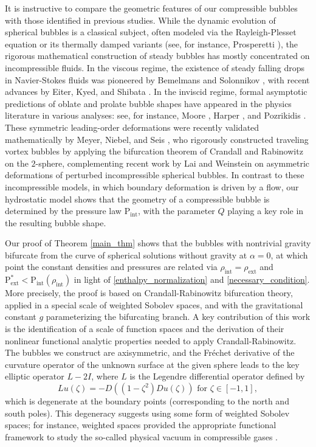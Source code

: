 \documentclass[11pt,reqno]{amsart}
\numberwithin{equation}{section}
\newcommand{\m}{\mathrm}
\def\pint{\m{P}_{\m{int}}}
\def\pext{\m{P}_{\m{ext}}}
\begin{document}
It is instructive to compare the geometric features of our compressible bubbles with those identified in previous studies.  While the dynamic evolution of spherical bubbles is a classical subject, often modeled via the Rayleigh-Plesset equation or its thermally damped variants (see, for instance, Prosperetti \cite{Pro_1991}), the rigorous mathematical construction of steady bubbles has mostly concentrated on incompressible fluids.  In the viscous regime, the existence of steady falling drops in Navier-Stokes fluids was pioneered by Bemelmans \cite{B_1981} and Solonnikov \cite{S_1999}, with recent advances by Eiter, Kyed, and Shibata \cite{EKS_2023}. In the inviscid regime, formal asymptotic predictions of oblate and prolate bubble shapes have appeared in the physics literature in various analyses: see, for instance, Moore \cite{M_1959}, Harper \cite{H_1972}, and Pozrikidis \cite{P_1989}.  These symmetric leading-order deformations were recently validated mathematically by Meyer, Niebel, and Seis \cite{MNS_2025}, who rigorously constructed traveling vortex bubbles by applying the bifurcation theorem of Crandall and Rabinowitz \cite{CR_1971} on the $2$-sphere, complementing recent work by Lai and Weinstein \cite{LaiW_2025} on asymmetric deformations of perturbed incompressible spherical bubbles.   In contrast to these incompressible models, in which boundary deformation is driven by a flow, our hydrostatic model shows that the geometry of a compressible bubble is determined by the pressure law $\pint$, with the parameter $Q$ playing a key role in the resulting bubble shape. 

 
 Our proof of Theorem \ref{main_thm} shows that the bubbles with nontrivial gravity bifurcate from the curve of spherical solutions without gravity at $\alpha =0$, at which point the constant densities and pressures are related via $\rho_{\m{int}} = \rho_{\m{ext}}$ and $\pext^\ast < \pint(\rho_{\m{int}})$ in light of \eqref{enthalpy_normalization} and \eqref{necessary_condition}.  More precisely, the proof is based on Crandall-Rabinowitz bifurcation theory, applied in a special scale of weighted Sobolev spaces, and with the gravitational constant $g$ parameterizing the bifurcating branch.  A key contribution of this work is the identification of a scale of function spaces and the derivation of their nonlinear functional analytic properties needed to apply Crandall-Rabinowitz.  The bubbles we construct are axisymmetric, and the  Fr\'{e}chet derivative of the curvature operator of the unknown surface at the given sphere leads to the key elliptic operator $L-2I $, where $L$ is the Legendre differential operator defined by 
\begin{equation}
L u(\zeta) = - D ((1-\zeta^2) D u(\zeta)) \text{ for }  \zeta \in [-1,1], 
\end{equation}
which is degenerate at the boundary points (corresponding to the north and south poles).  This degeneracy suggests using some form of weighted Sobolev spaces; for instance, weighted spaces provided the appropriate functional framework to study the so-called physical vacuum in compressible gases \cite{JM_2015}.
\end{document}
